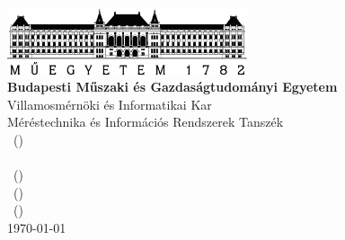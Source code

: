
\begin{titlepage}

\begin{center}
\includegraphics[width=200pt,keepaspectratio]{figures/BMElogo.png}\\
\vspace{0.3cm}
\textbf{Budapesti Műszaki és Gazdaságtudományi Egyetem}\\
\textmd{Villamosmérnöki és Informatikai Kar}\\
\textmd{Méréstechnika és Információs Rendszerek Tanszék}\\
\textmd{\course \ (\coursecode)}\\[5cm]

{\huge \bfseries \hwtitle}\\[0.8cm]
\vspace{0.5cm}
\textsc{\Large \authornamea \ (\authorneptuna)}\\[0.5cm]
\textsc{\Large \authornameb \ (\authorneptunb)}\\[0.5cm]
\textsc{\Large \authornamec \ (\authorneptunc)}
\vspace{0.5cm}  \\[4cm]

\vspace{4cm}
\textsc{\Large \today}\\


\end{center}

\end{titlepage}


